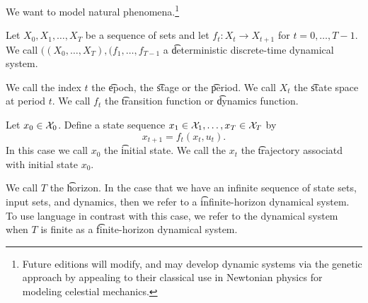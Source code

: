 

We want to model natural phenomena.\footnote{Future editions will modify, and may develop dynamic systems via the genetic approach by appealing to their classical use in Newtonian physics for modeling celestial mechanics.}


Let $X_0, X_1, \dots, X_T$ be a sequence of sets and let $f_t: X_t \to X_{t+1}$ for $t = 0, \dots, T-1$.
We call $((X_0, \dots, X_T), (f_1, \dots, f_{T-1}$ a \t{deterministic discrete-time dynamical system}.

We call the index $t$ the \t{epoch}, the \t{stage} or the \t{period}.
We call $X_t$ the \t{state space} at period $t$.
We call $f_t$ the \t{transition function} or \t{dynamics function}.

Let $x_0 \in \mathcal{X}_0$.  Define a state sequence $x_1 \in \mathcal{X}_1, \dots, x_T \in \mathcal{X}_T$ by
\[
    x_{t+1} = f_t(x_t, u_t).
\]
In this case we call $x_0$ the \t{initial state}.
We call the $x_t$ the \t{trajectory} associatd with initial state $x_0$.

We call $T$ the \t{horizon}.
In the case that we have an infinite sequence of state sets, input sets, and dynamics, then we refer to a \t{infinite-horizon} dynamical system.
To use language in contrast with this case, we refer to the dynamical system when $T$ is finite as a \t{finite-horizon} dynamical system.

\blankpage
